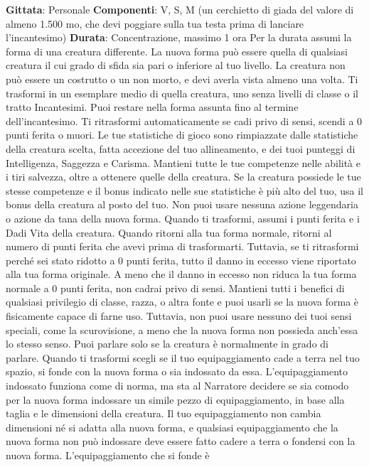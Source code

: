 \begin{multicols}{2}
\textbf{Gittata}: Personale
\textbf{Componenti}: V, S, M (un cerchietto di giada del valore
di almeno 1.500 mo, che devi poggiare sulla tua testa
prima di lanciare l’incantesimo)
\textbf{Durata}: Concentrazione, massimo 1 ora
Per la durata assumi la forma di una creatura differente.
La nuova forma può essere quella di qualsiasi creatura
il cui grado di sfida sia pari o inferiore al tuo livello. La 
creatura non può essere un costrutto o un non morto, e
devi averla vista almeno una volta. Ti trasformi in un
esemplare medio di quella creatura, uno senza livelli di
classe o il tratto Incantesimi.
Puoi restare nella forma assunta fino al termine
dell’incantesimo. Ti ritrasformi automaticamente se cadi
privo di sensi, scendi a 0 punti ferita o muori.
Le tue statistiche di gioco sono rimpiazzate dalle
statistiche della creatura scelta, fatta accezione del tuo
allineamento, e dei tuoi punteggi di Intelligenza,
Saggezza e Carisma. Mantieni tutte le tue competenze
nelle abilità e i tiri salvezza, oltre a ottenere quelle della
creatura. Se la creatura possiede le tue stesse
competenze e il bonus indicato nelle sue statistiche è
più alto del tuo, usa il bonus della creatura al posto del
tuo. Non puoi usare nessuna azione leggendaria o
azione da tana della nuova forma.
Quando ti trasformi, assumi i punti ferita e i Dadi Vita
della creatura. Quando ritorni alla tua forma normale,
ritorni al numero di punti ferita che avevi prima di
trasformarti. Tuttavia, se ti ritrasformi perché sei stato
ridotto a 0 punti ferita, tutto il danno in eccesso viene
riportato alla tua forma originale. A meno che il danno in
eccesso non riduca la tua forma normale a 0 punti
ferita, non cadrai privo di sensi.
Mantieni tutti i benefici di qualsiasi privilegio di classe,
razza, o altra fonte e puoi usarli se la nuova forma è
fisicamente capace di farne uso. Tuttavia, non puoi
usare nessuno dei tuoi sensi speciali, come la
scurovisione, a meno che la nuova forma non possieda
anch’essa lo stesso senso. Puoi parlare solo se la
creatura è normalmente in grado di parlare.
Quando ti trasformi scegli se il tuo equipaggiamento
cade a terra nel tuo spazio, si fonde con la nuova forma
o sia indossato da essa. L’equipaggiamento indossato
funziona come di norma, ma sta al Narratore decidere se sia
comodo per la nuova forma indossare un simile pezzo
di equipaggiamento, in base alla taglia e le dimensioni
della creatura. Il tuo equipaggiamento non cambia
dimensioni né si adatta alla nuova forma, e qualsiasi
equipaggiamento che la nuova forma non può
indossare deve essere fatto cadere a terra o fondersi
con la nuova forma. L’equipaggiamento che si fonde è

\end{multicols}
